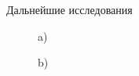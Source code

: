 \documentclass{beamer}
\begin{document}
\begin{frame}{Дальнейшие исследования}
    \begin{figure}[H]
        \begin{minipage}[h]{0.35\linewidth}
             a) \\
        \end{minipage}
        \hfill
        \begin{minipage}[h]{0.35\linewidth}
             b) \\
        \end{minipage}
        \vfill
        \begin{minipage}[h]{0.35\linewidth}

\end{minipage}
\end{figure}
\end{frame}
\end{document}
